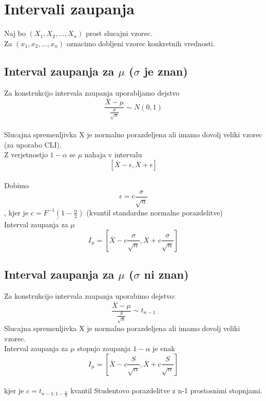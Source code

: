 \section{Intervali zaupanja}
Naj bo $(X_1, X_2, ..., X_n)$ prost slucajni vzorec.\\
Za $(x_1, x_2, ..., x_n)$ oznacimo dobljeni vzorec konkretnih vrednosti.

\begin{center}
\end{center}

\subsection{Interval zaupanja za $\mu$ ($\sigma$ je znan)}
Za konstrukcijo intervala zaupanja uporabljamo dejstvo\\
$$\frac{\overline{X}-\mu}{\frac{\sigma}{\sqrt{n}}}\sim N(0,1)$$\\
Slucajna spremenljivka X je normalno porazdeljena ali imamo dovolj veliki vzorec (za uporabo CLI).\\
Z verjetnostjo $1-\alpha$ se $\mu$ nahaja v intervalu $$[\overline{X}-\epsilon, \overline{X}+\epsilon]$$\\
Dobimo $$\epsilon=c\frac{\sigma}{\sqrt{n}}$$, kjer je $\underline{c=F^{-1}(1-\frac{\alpha}{2})}$ (kvantil standardne normalne porazdelitve)\\
Interval zaupanja za $\mu$\\
$$I_\mu = \left[\overline{X}-c\frac{\sigma}{\sqrt{n}},\overline{X}+c\frac{\sigma}{\sqrt{n}}\right]$$    


\subsection{Interval zaupanja za $\mu$ ($\sigma$ ni znan)}
Za konstrukcijo intervala zaupanja uporabimo dejstvo:\\
$$\frac{\overline{X}-\mu}{\frac{S}{\sqrt{n}}}\sim t_{n-1}$$
Slucajna spremenljivka X je normalno porazdeljena ali imamo dovolj veliki vzorec.\\
Interval zaupanja za $\mu$ stopnjo zaupanja $1-\alpha$ je enak\\
$$I_\mu = \left[ \overline{X}- c\frac{S}{\sqrt{n}}, \overline{X}+ c\frac{S}{\sqrt{n}}\right]$$\\
kjer je $c=t_{n-1;1-\frac{\alpha}{2}}$ kvantil Studentovo porazdelitve z n-1 prostosnimi stopnjami.\\


